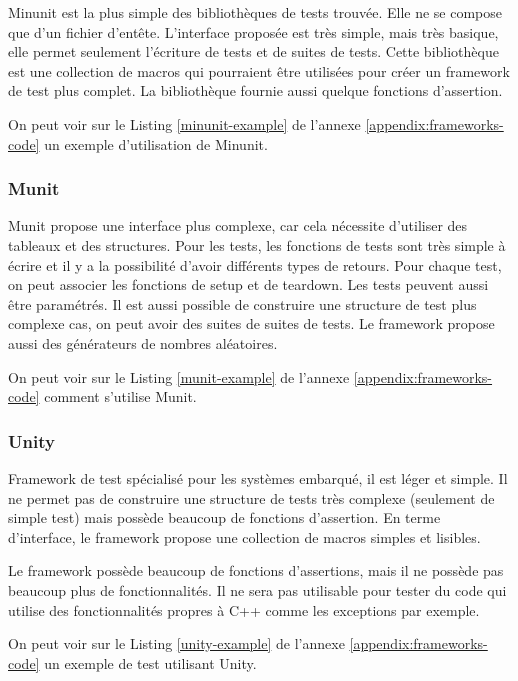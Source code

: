 \documentclass[a4paper]{article}
\begin{document}
Minunit est la plus simple des bibliothèques de tests trouvée. Elle ne se
compose que d'un fichier d'entête. L'interface proposée est très simple, mais
très basique, elle permet seulement l'écriture de tests et de suites de tests.
Cette bibliothèque est une collection de macros qui pourraient être utilisées
pour créer un framework de test plus complet. La bibliothèque fournie aussi
quelque fonctions d'assertion.

On peut voir sur le Listing \ref{minunit-example} de l'annexe
\ref{appendix:frameworks-code} un exemple d'utilisation de Minunit.

\subsubsection*{Munit}

Munit propose une interface plus complexe, car cela nécessite d'utiliser des
tableaux et des structures. Pour les tests, les fonctions de tests sont très
simple à écrire et il y a la possibilité d'avoir différents types de retours.
Pour chaque test, on peut associer les fonctions de setup et de teardown. Les
tests peuvent aussi être paramétrés. Il est aussi possible de construire une
structure de test plus complexe cas, on peut avoir des suites de suites de tests.
Le framework propose aussi des générateurs de nombres aléatoires.

On peut voir sur le Listing \ref{munit-example} de l'annexe
\ref{appendix:frameworks-code} comment s'utilise Munit.

\subsubsection*{Unity}

Framework de test spécialisé pour les systèmes embarqué, il est léger et simple.
Il ne permet pas de construire une structure de tests très complexe (seulement
de simple test) mais possède beaucoup de fonctions d'assertion. En terme
d'interface, le framework propose une collection de macros simples et lisibles.

Le framework possède beaucoup de fonctions d'assertions, mais il ne possède pas
beaucoup plus de fonctionnalités. Il ne sera pas utilisable pour tester du code
qui utilise des fonctionnalités propres à C++ comme les exceptions par exemple.

On peut voir sur le Listing \ref{unity-example} de l'annexe
\ref{appendix:frameworks-code} un exemple de test utilisant Unity.
\end{document}
